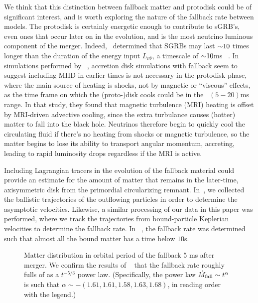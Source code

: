 We think that this distinction between fallback matter and protodisk could be of significant interest, and is worth exploring the nature of the fallback rate between models.
The protodisk is certainly energetic enough to contribute to sGRB's, even ones that occur later on in the evolution, and is the most neutrino luminous component of the merger.
Indeed,~\cite{Aloy:2004nh} determined that SGRBs may last $\mathord{\sim}10$ times longer than the duration of the energy input $L_{\nu \bar{\nu}}$, a timescale of $\mathord{\sim} 10$ms ~\cite{shibata2006magnetized}.
In simulations performed by ~\cite{noori2016dissertation}, accretion disk simulations with fallback seem to suggest including MHD in earlier times is not necessary in the protodisk phase, where the main source of heating is shocks, not by magnetic or ``viscous'' effects, as the time frame on which the (proto-)disk cools could be in the ~$(5-20)$ms range.
In that study, they found that magnetic turbulence (MRI) heating is offset by MRI-driven advective cooling, since the extra turbulance causes (hotter) matter to fall into the black hole.
Neutrinos therefore begin to quickly cool the circulating fluid if there's no heating from shocks or magnetic turbulence, so the matter begins to lose its ability to transport angular momentum, accreting, leading to rapid luminosity drops regardless if the MRI is active.

Including Lagrangian tracers in the evolution of the fallback material could provide an estimate for the amount of matter that remains in the later-time, axisymmetric disk from the primordial circularizing remnant.
In~\cite{FoucartDD2:2017}, we collected the ballistic trajectories of the outflowing particles in order to determine the asymptotic velocities.
Likewise, a similar processing of our data in this paper was performed, where we track the trajectories from bound-particle Keplerian velocities to determine the fallback rate.  In ~\cite{Chawla:2010sw}, the fallback rate was determined such that almost all the bound matter has a time below $10$s. 

\begin{figure}
	\centering
	
	\caption[Rate of fallback matter depletion]{
		Matter distribution in orbital period of the fallback 5 ms after merger.  We confirm the results of ~\cite{Chawla:2010sw} that the fallback rate roughly fulls of as a $t^{-5/3}$ power law.  (Specifically, the power law $\dot{M}_{\rm fall} \sim t^{\alpha}$ is such that $\alpha \sim -(1.61,1.61,1.58,1.63,1.68)$, in reading order with the legend.)
	}
	\label{fig:fallback}
\end{figure}

